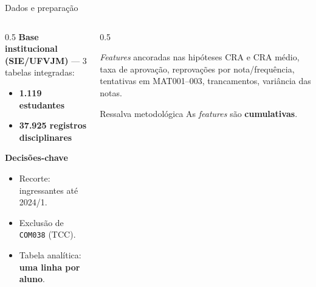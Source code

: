\documentclass[aspectratio=169,11pt,brazil]{beamer}
\begin{document}
\begin{frame}{Dados e preparação}
  \begin{columns}[T]
    \begin{column}{0.5\textwidth}
      \textbf{Base institucional (SIE/UFVJM)} --- 3 tabelas integradas:
      \begin{itemize}
        \item \textbf{1.119 estudantes}
        \item \textbf{37.925 registros disciplinares}
      \end{itemize}
      \medskip
      \textbf{Decisões-chave}
      \begin{itemize}
        \item Recorte: ingressantes até 2024/1.
        \item Exclusão de \texttt{COM038} (TCC).
        \item Tabela analítica: \textbf{uma linha por aluno}.
      \end{itemize}
    \end{column}
    \begin{column}{0.5\textwidth}
      \begin{block}{\emph{Features} ancoradas nas hipóteses}
        \small
        CRA e CRA médio, taxa de aprovação, reprovações por nota/frequência, tentativas em MAT001--003, trancamentos, variância das notas.
      \end{block}
      \begin{alertblock}{Ressalva metodológica}
        \small As \emph{features} são \textbf{cumulativas}.
      \end{alertblock}
    \end{column}
  \end{columns}
\end{frame}
\end{document}
